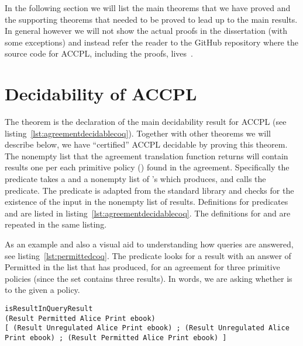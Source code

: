 In the following section we will list the main theorems that we have proved and the supporting theorems that needed to be proved to lead up to the main results. In general however we will not show the actual proofs in the dissertation (with some exceptions) and instead refer the reader to the GitHub repository where the source code for \ac{ACCPL}, including the proofs, lives~\cite{BahmanSistany2015}.

\section{Decidability of ACCPL}\label{sec:maintheorems}

The theorem  is the declaration of the main decidability result for \ac{ACCPL} (see listing~\ref{lst:agreementdecidablecoq}). Together with other theorems we will describe below, we have ``certified'' \ac{ACCPL} decidable by proving this theorem. The nonempty list that the agreement translation function  returns will contain results one per each primitive policy () found in the agreement. Specifically the predicate  takes a  and a nonempty list of 's which  produces, and calls the  predicate. The  predicate is adapted from the  standard library and checks for the existence of the input  in the nonempty list of results. Definitions for predicates  and  are listed in listing~\ref{lst:agreementdecidablecoq}. The definitions for  and  are repeated in the same listing. 

As an example and also a visual aid to understanding how queries are answered, see listing~\ref{lst:permittedcoq}. The  predicate looks for a result with an answer of Permitted in the list that  has produced, for an agreement for three primitive policies (since the set contains three results). In words, we are asking whether  is  to  the  given a policy.  

\begin{lstlisting}
isResultInQueryResult
(Result Permitted Alice Print ebook) 
[ (Result Unregulated Alice Print ebook) ; (Result Unregulated Alice Print ebook) ; (Result Permitted Alice Print ebook) ]
\end{lstlisting}
    
